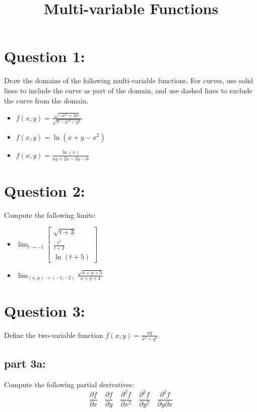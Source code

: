 \documentclass{article}
\title{Multi-variable Functions}
\date{}
\newcommand{\colvec}[3]{\begin{bmatrix} #1 \\ #2 \\ #3 \end{bmatrix}}
\begin{document}
\maketitle

\section*{Question 1:}

Draw the domains of the following multi-variable functions. For curves, use solid lines to include the curve as part of the domain, and use dashed lines to exclude the curve from the domain.

\begin{itemize}
\item \(f(x,y) = \frac{\sqrt{-x^2 + 4x}}{\sqrt{9 - x^2 - y^2}}\)
\item \(f(x,y) = \ln(x + y - x^2)\)
\item \(f(x,y) = \frac{\ln(x)}{xy + 2x - 3y - 6}\)
\end{itemize}



\section*{Question 2:}

Compute the following limits:

\begin{itemize}
\item \(\lim_{t \to -1} \colvec{\sqrt{t + 3}}{\frac{t^2}{t+2}}{\ln(t + 5)}\)
\item \(\lim_{(x,y) \to (-1,-2)} \frac{\sqrt{x+y+5}}{x+y+4}\)
\end{itemize}



\section*{Question 3:}

Define the two-variable function \(f(x,y) = \frac{xy}{x^2 + y^2}\).

\subsection*{part 3a:}

Compute the following partial derivatives:
\[\frac{\partial f}{\partial x} \quad \frac{\partial f}{\partial y} \quad \frac{\partial^2 f}{\partial x^2} \quad \frac{\partial^2 f}{\partial y^2} \quad \frac{\partial^2 f}{\partial y \partial x}\] 
\end{document}
